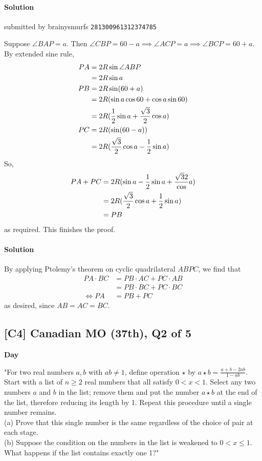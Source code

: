 \documentclass[10pt]{article}
\newcommand{\themonth}{March}
\newcommand{\theyear}{2019}
\newcounter{day}
\newcounter{solution}
\newcounter{datenumber}
\newcommand{\problem}[4][0]{
	\newpage
	\subsection{[#3] \space #2} \hfill 
	{\large\textbf{Day \arabic{day}}} %
	\begin{flushleft} #4 \end{flushleft}
	\vspace{1em}
	\addtocounter{day}{1}
	\addtocounter{datenumber}{1}
	\setcounter{solution}{1}
}
\newcommand{\solution}[4][0]{
	\paragraph{Solution \arabic{solution}} \hfill submitted by #2 \hfill \texttt{#3}
	\begin{flushleft} #4 \end{flushleft}
	\addtocounter{solution}{1}
	\vspace{1em}
}
\newcommand{\anonsolution}[2][0]{
	\paragraph{Solution \arabic{solution}} 
	\begin{flushleft} #2 \end{flushleft}
	\addtocounter{solution}{1}
	\vspace{1em}
}
\begin{document}
\solution[37]{brainysmurfs}{281300961312374785}{
Suppose $\angle BAP = a$. Then $\angle CBP = 60 - a \implies \angle ACP = a \implies \angle BCP = 60 + a$. \\
By extended sine rule, 
\begin{equation}
$$\begin{align*}
PA &= 2R \sin \angle ABP\\
&= 2R \sin a\\
PB &= 2R \sin (60 + a) \\
&= 2R (\sin a \cos 60 + \cos a \sin 60)\\
&= 2R(\frac{1}{2}\sin a + \frac{\sqrt{3}}{2}\cos a)\\
PC &= 2R(\sin(60 - a))\\
&= 2R(\frac{\sqrt{3}}{2} \cos a - \frac{1}{2}\sin a)
\end{align*}$$\end{equation}
So, 
\begin{equation}
$$\begin{align*}
PA+PC &= 2R(\sin a - \frac{1}{2} \sin a + \frac{\sqrt{3}{2}} \cos a)\\
&= 2R(\frac{\sqrt{3}}{2} \cos a + \frac{1}{2} \sin a)\\
&= PB \\
\end{align*}$$
\end{equation}
as required. This finishes the proof. 
}

\anonsolution[37]{By applying Ptolemy's theorem on cyclic quadrilateral \(ABPC\), we find that \begin{align*} PA\cdot BC&= PB\cdot AC+PC\cdot AB \\ &= PB\cdot BC +PC\cdot BC \\ \iff PA&=PB+PC \end{align*} as desired, since \(AB=AC=BC\).}

\renewcommand{\themonth}{May}
\setcounter{datenumber}{1}

\problem[38]{2007 Canadian MO (37th), Q2 of 5}{C4}{"For two real numbers $a,b$ with $ab \neq 1$, define operation $\star$ by $a \star b = \frac{a + b - 2ab}{1 - ab}$. Start with a list of $n \geq 2$ real numbers that all satisfy $0 < x < 1$. Select any two numbers $a$ and $b$ in the list; remove them and put the number $a \star b$ at the end of the list, therefore reducing its length by 1. Repeat this procedure until a single number remains.\\
	(a) Prove that this single number is the same regardless of the choice of pair at each stage.\\
	(b) Suppose the condition on the numbers in the list is weakened to $0 < x \leq 1$. What happens if the list contains exactly one 1?"}
\end{document}
